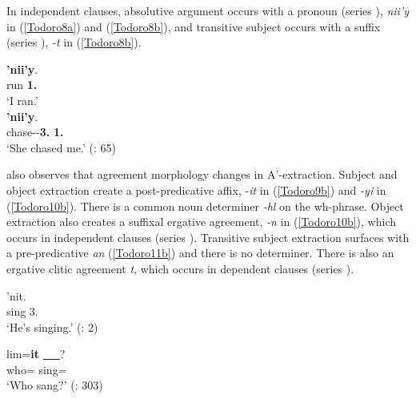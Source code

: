 \documentclass[output=paper]{langscibook}
\begin{document}
In independent clauses, absolutive argument occurs with a pronoun (series {\seriesIII}), \emph{nii’y} in (\ref{Todoro8a}) and (\ref{Todoro8b}), and transitive subject occurs with a suffix (series {\seriesII}), \emph{-t} in (\ref{Todoro8b}).

\begin{exe}
\ex \label{Todoro8}
\begin{xlist}

\ex \label{Todoro8a} 
 {\textbf{'nii'y}}.\\
   run \textbf{1{\sg}.{\seriesIII}}\\
\glt `I ran.’  \citep[65]{forbes2019a}\\

\ex \label{Todoro8b}
 {\textbf{'nii'y}}.\\
    chase-{\tr}-\textbf{3.{\seriesII}}  \textbf{1{\sg}.{\seriesIII}} \\
\glt `She chased me.’ (\citealt{forbes2019a}: 65) \\

\end{xlist}
\end{exe}

\citet{forbes2019a} also observes that agreement morphology changes in A’-extraction. Subject and object extraction create a post-predicative affix, -\textit{it} in (\ref{Todoro9b}) and \emph{-yi} in (\ref{Todoro10b}). There is a common noun determiner \emph{-hl} on the wh-phrase. Object extraction also creates a suffixal ergative agreement, \emph{-n} in (\ref{Todoro10b}), which occurs in independent clauses (series {\seriesII}). Transitive subject extraction surfaces with a pre-predicative \textit{an} (\ref{Todoro11b}) and there is no determiner. There is also an ergative clitic agreement \emph{t}, which occurs in dependent clauses (series {\seriesI}). 

\begin{exe}
\ex \label{Todoro9}
\begin{xlist}

\ex \label{Todoro9a}
 {'nit.} \\
    sing 3.{\seriesIII} \\
\glt `He's singing.' (\citealt{forbes2017a}: 2)

\ex \label{Todoro9b}
 {lim=\textbf{it}} \uline{~~~}? \\
    who={\cn} sing={\sx} \\
\glt `Who sang?' (\citealt{rigsby1986a}: 303)

\end{xlist}
\end{exe}
\end{document}
